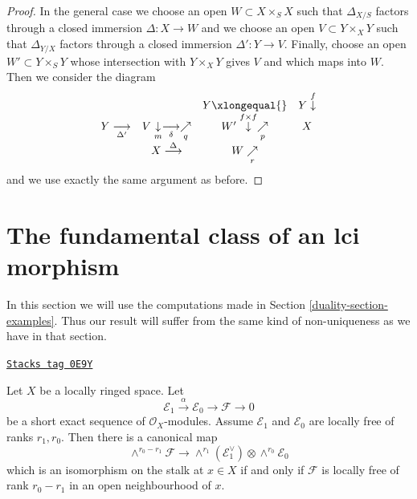 \begin{proof}
\medskip\noindent
In the general case we choose an open $W \subset X \times_S X$
such that $\Delta_{X/S}$ factors through a closed immersion
$\Delta : X \to W$ and we choose an open $V \subset Y \times_X Y$
such that $\Delta_{Y/X}$ factors through a closed immersion
$\Delta' : Y \to V$. Finally, choose an open
$W' \subset Y \times_S Y$ whose intersection with $Y \times_X Y$
gives $V$ and which maps into $W$. Then we consider the diagram
$$
\begin{array}{cccc} &  & Y \xlongequal{} & Y \overset{f}{\downarrow} \\ Y \underset{\Delta'}{\longrightarrow} & V \underset{m}{\downarrow}\underset{\delta}{\longrightarrow}\underset{q}{\nearrow} & W' \overset{f \times f}{\downarrow}\underset{p}{\nearrow} & X \\  & X \overset{\Delta}{\longrightarrow} & W \underset{r}{\nearrow} & \end{array}
$$
and we use exactly the same argument as before.
\end{proof}

\section{The fundamental class of an lci morphism}
\label{duality-section-fundamental-class}
In this section we will use the computations made in
Section \ref{duality-section-examples}. Thus our result will suffer
from the same kind of non-uniqueness as we have in that section.

\begin{lemma}[Determinant]
\label{duality-lemma-determinant}
\href{https://stacks.math.columbia.edu/tag/0E9Y}{\texttt{Stacks tag 0E9Y}}

Let $X$ be a locally ringed space. Let
$$
\mathcal{E}_1 \xrightarrow{\alpha} \mathcal{E}_0 \to \mathcal{F} \to 0
$$
be a short exact sequence of $\mathcal{O}_X$-modules.
Assume $\mathcal{E}_1$ and $\mathcal{E}_0$ are locally
free of ranks $r_1, r_0$. Then there is a canonical map
$$
\wedge^{r_0 - r_1}\mathcal{F}
\longrightarrow
\wedge^{r_1}(\mathcal{E}_1^\vee) \otimes \wedge^{r_0}\mathcal{E}_0
$$
which is an isomorphism on the stalk at $x \in X$
if and only if $\mathcal{F}$ is locally free of rank $r_0 - r_1$
in an open neighbourhood of $x$.
\end{lemma}

